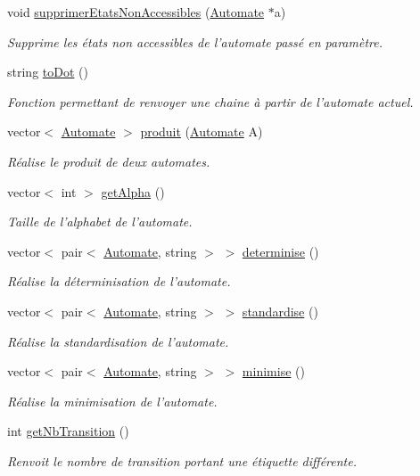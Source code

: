 \begin{DoxyCompactItemize}
void \hyperlink{class_automate_ac808d99ac1a43b37e5e7ffc95c54cd40}{supprimer\-Etats\-Non\-Accessibles} (\hyperlink{class_automate}{Automate} $\ast$a)
\begin{DoxyCompactList}\small\item\em Supprime les états non accessibles de l'automate passé en paramètre. \end{DoxyCompactList}\item 
string \hyperlink{class_automate_af1f2f1cd64780ff7b302936787aeac38}{to\-Dot} ()
\begin{DoxyCompactList}\small\item\em Fonction permettant de renvoyer une chaine à partir de l'automate actuel. \end{DoxyCompactList}\item 
vector$<$ \hyperlink{class_automate}{Automate} $>$ \hyperlink{class_automate_a0e2d212ace9f993021c9112aa99b7aed}{produit} (\hyperlink{class_automate}{Automate} A)
\begin{DoxyCompactList}\small\item\em Réalise le produit de deux automates. \end{DoxyCompactList}\item 
vector$<$ int $>$ \hyperlink{class_automate_ab18acfedc3d9704ab08d8fd464efccfe}{get\-Alpha} ()
\begin{DoxyCompactList}\small\item\em Taille de l'alphabet de l'automate. \end{DoxyCompactList}\item 
vector$<$ pair$<$ \hyperlink{class_automate}{Automate}, string $>$ $>$ \hyperlink{class_automate_aa1829f8d4512f67d4e3efb945cc550f0}{determinise} ()
\begin{DoxyCompactList}\small\item\em Réalise la déterminisation de l'automate. \end{DoxyCompactList}\item 
vector$<$ pair$<$ \hyperlink{class_automate}{Automate}, string $>$ $>$ \hyperlink{class_automate_a32ec8c518bd5d988ac10544b13c0bb95}{standardise} ()
\begin{DoxyCompactList}\small\item\em Réalise la standardisation de l'automate. \end{DoxyCompactList}\item 
vector$<$ pair$<$ \hyperlink{class_automate}{Automate}, string $>$ $>$ \hyperlink{class_automate_af8297f77add39ea70a0877f85dedcf28}{minimise} ()
\begin{DoxyCompactList}\small\item\em Réalise la minimisation de l'automate. \end{DoxyCompactList}\item 
int \hyperlink{class_automate_aa2070cd084587f8999e3d9cd847f5c1d}{get\-Nb\-Transition} ()
\begin{DoxyCompactList}\small\item\em Renvoit le nombre de transition portant une étiquette différente. \end{DoxyCompactList}\end{DoxyCompactItemize}
